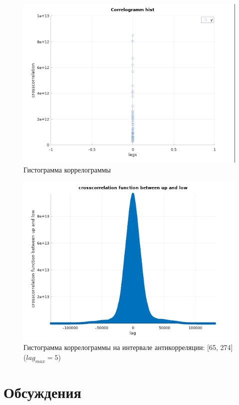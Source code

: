 \documentclass[12pt]{article}
\begin{document}
\begin{figure}[H]
\caption{Гистограмма коррелограммы}
\begin{center}
\includegraphics[scale = 0.9]{plot9.png} 
\end{center}
\end{figure}

\begin{figure}[H]
\caption{Гистограмма коррелограммы на интервале антикорреляции: [65, 274] ($lag_{max} = 5$)}
\begin{center}
\includegraphics[scale = 0.9]{plot5.png} 
\end{center}
\end{figure}

\section{Обсуждения}
\end{document}

